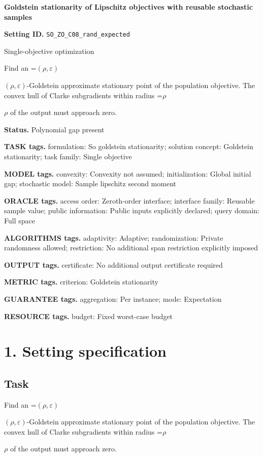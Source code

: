 \documentclass[10pt,a4paper]{article}
\newcommand{\AtlasMath}[1]{\par\begingroup\centering\setbox0=\hbox{$\displaystyle #1$}\ifdim\wd0>1.4\linewidth\typeout{ATLAS WIDE FORMULA: \the\wd0}\fi\ifdim\wd0>\linewidth\resizebox{\linewidth}{!}{\box0}\else\box0\fi\par\endgroup}
\newcommand{\AtlasInlineMath}[1]{\begingroup\setbox0=\hbox{$#1$}\ifdim\wd0>.4\linewidth\endgroup\AtlasMath{#1}\else\endgroup$#1$\fi}
\begin{document}
\raggedright

{\LARGE\bfseries\sffamily\color{AtlasNavy} Goldstein stationarity of Lipschitz objectives with reusable stochastic samples\par}\vspace{5pt}
\textbf{Setting ID.} \texttt{SO\_\allowbreak{}ZO\_\allowbreak{}C08\_\allowbreak{}rand\_\allowbreak{}expected}

Single-objective optimization

Find an \AtlasInlineMath{(\rho,\varepsilon)}-Goldstein approximate stationary point of the population objective. The convex hull of Clarke subgradients within radius \AtlasInlineMath{\rho} of the output must approach zero.

\textbf{Status.} Polynomial gap present

\textbf{TASK tags.} formulation: So goldstein stationarity; solution concept: Goldstein stationarity; task family: Single objective

\textbf{MODEL tags.} convexity: Convexity not assumed; initialization: Global initial gap; stochastic model: Sample lipschitz second moment

\textbf{ORACLE tags.} access order: Zeroth-order interface; interface family: Reusable sample value; public information: Public inputs explicitly declared; query domain: Full space

\textbf{ALGORITHMS tags.} adaptivity: Adaptive; randomization: Private randomness allowed; restriction: No additional span restriction explicitly imposed

\textbf{OUTPUT tags.} certificate: No additional output certificate required

\textbf{METRIC tags.} criterion: Goldstein stationarity

\textbf{GUARANTEE tags.} aggregation: Per instance; mode: Expectation

\textbf{RESOURCE tags.} budget: Fixed worst-case budget

\section{1. Setting specification}
\subsection{Task}
Find an \AtlasInlineMath{(\rho,\varepsilon)}-Goldstein approximate stationary point of the population objective. The convex hull of Clarke subgradients within radius \AtlasInlineMath{\rho} of the output must approach zero.
\end{document}
